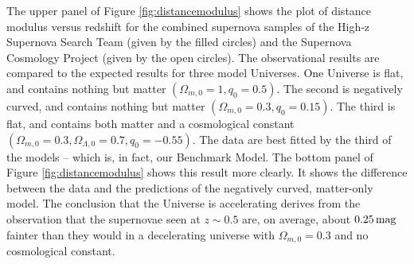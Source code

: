 \documentclass[a4paper,11pt]{article}
\begin{document}
{\noindent}The upper panel of Figure \ref{fig:distancemodulus} shows the plot of distance modulus versus redshift for the combined supernova samples of the High-z Supernova Search Team (given by the filled circles) and the Supernova Cosmology Project (given by the open circles). The observational results are compared to the expected results for three model Universes. One Universe is flat, and contains nothing but matter $(\Omega_{m,0}=1, q_0=0.5)$. The second is negatively curved, and contains nothing but matter $(\Omega_{m,0}=0.3, q_0=0.15)$. The third is flat, and contains both matter and a cosmological constant $(\Omega_{m,0}=0.3, \Omega_{\Lambda,0}=0.7, q_0=−0.55).$ The data are best fitted by the third of the models -- which is, in fact, our Benchmark Model. The bottom panel of Figure \ref{fig:distancemodulus} shows this result more clearly. It shows the difference between the data and the predictions of the negatively curved, matter-only model. The conclusion that the Universe is accelerating derives from the observation that the supernovae seen at $z \sim 0.5$ are, on average, about $0.25\,{\rm mag}$ fainter than they would in a decelerating universe with $\Omega_{m,0}=0.3$ and no cosmological constant.
 
\end{document}
